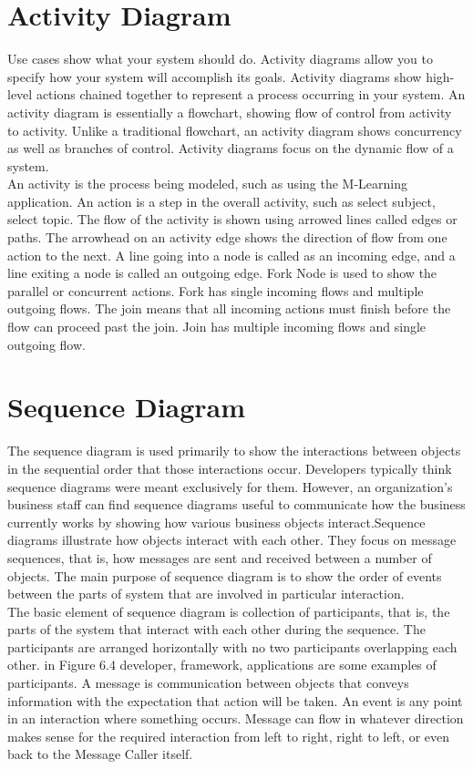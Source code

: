 \documentclass[openany,12pt]{report}
\begin{document}
\newpage
\section{Activity Diagram}
\hspace*{0.5in}Use cases show what your system should do. Activity diagrams allow you to specify how your system will accomplish its goals. Activity diagrams show high-level actions chained together to represent a process occurring in your system. An activity diagram is essentially a flowchart, showing flow of control from activity to activity. Unlike a traditional flowchart, an activity diagram shows concurrency as well as branches of control. Activity diagrams focus on the dynamic flow of a system.\\
\hspace*{0.5in}An activity is the process being modeled, such as using the M-Learning application. An action is a step in the overall activity, such as select subject, select topic. The flow of the activity is shown using arrowed lines called edges or paths. The arrowhead on an activity edge shows the direction of flow from one action to the next. A line going into a node is called as an incoming edge, and a line exiting a node is called an outgoing edge. Fork Node is used to show the parallel or concurrent actions. Fork has single incoming flows and multiple outgoing flows. The join means that all incoming actions must finish before the flow can proceed past the join. Join has multiple incoming flows and single outgoing flow.
\newpage

\section{Sequence Diagram}
\hspace*{0.5in}The sequence diagram is used primarily to show the interactions between objects in the sequential order that those interactions occur. Developers typically think sequence diagrams were meant exclusively for them. However, an organization's business staff can find sequence diagrams useful to communicate how the business currently works by showing how various business objects interact.Sequence diagrams illustrate how objects interact with each other. They focus on message sequences, that is, how messages are sent and received between a number of objects. The main purpose of sequence diagram is to show the order of events between the parts of system that are involved in particular interaction.\\
\hspace*{0.5in}The basic element of sequence diagram is collection of participants, that is, the parts of the system that interact with each other during the sequence. The participants are arranged horizontally with no two participants overlapping each other. in Figure 6.4 developer, framework, applications are some examples of participants. A message is communication between objects that conveys information with the expectation that action will be taken. An event is any point in an interaction where something occurs. Message can flow in whatever direction makes sense for the required interaction from left to right, right to left, or even back to the Message Caller itself.
\end{document}
